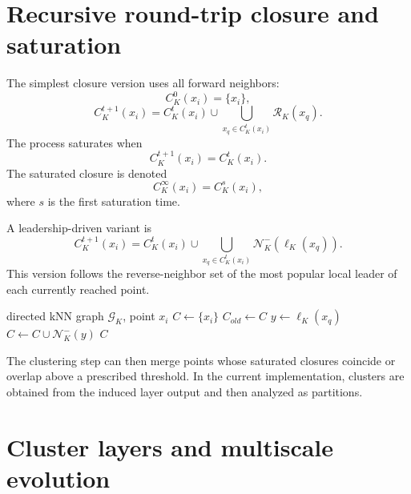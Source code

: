 \documentclass[pdflatex,sn-mathphys-num]{sn-jnl}
\theoremstyle{thmstyleone}
\theoremstyle{thmstyletwo}
\theoremstyle{thmstylethree}
\newcommand{\calG}{\mathcal{G}}
\newcommand{\calN}{\mathcal{N}}
\newcommand{\calR}{\mathcal{R}}
\begin{document}
\section{Recursive round-trip closure and saturation}\label{sec:closure}

The simplest closure version uses all forward neighbors:
\begin{equation}
C_K^0(x_i)=\{x_i\},
\end{equation}
\begin{equation}
C_K^{t+1}(x_i)=C_K^t(x_i)\cup
\bigcup_{x_q\in C_K^t(x_i)}\calR_K(x_q).
\label{eq:closure_all_neighbors}
\end{equation}
The process saturates when
\begin{equation}
C_K^{t+1}(x_i)=C_K^t(x_i).
\end{equation}
The saturated closure is denoted
\begin{equation}
C_K^\infty(x_i)=C_K^s(x_i),
\end{equation}
where $s$ is the first saturation time.

A leadership-driven variant is
\begin{equation}
C_K^{t+1}(x_i)=C_K^t(x_i)\cup
\bigcup_{x_q\in C_K^t(x_i)}\calN_K^-(\ell_K(x_q)).
\label{eq:closure_leadership}
\end{equation}
This version follows the reverse-neighbor set of the most popular local leader of each currently reached point.

\begin{algorithm}[t]
\caption{Leadership-driven round-trip closure for one point}
\label{alg:closure}
\begin{algorithmic}[1]
\Require directed kNN graph $\calG_K$, point $x_i$
\State $C \gets \{x_i\}$
\Repeat
    \State $C_{old}\gets C$
        \State $y\gets \ell_K(x_q)$
        \State $C\gets C\cup\calN_K^-(y)$
    \EndFor
{}
\State \Return $C$
\end{algorithmic}
\end{algorithm}

The clustering step can then merge points whose saturated closures coincide or overlap above a prescribed threshold. In the current implementation, clusters are obtained from the induced layer output and then analyzed as partitions.

\section{Cluster layers and multiscale evolution}\label{sec:layers}
\end{document}
